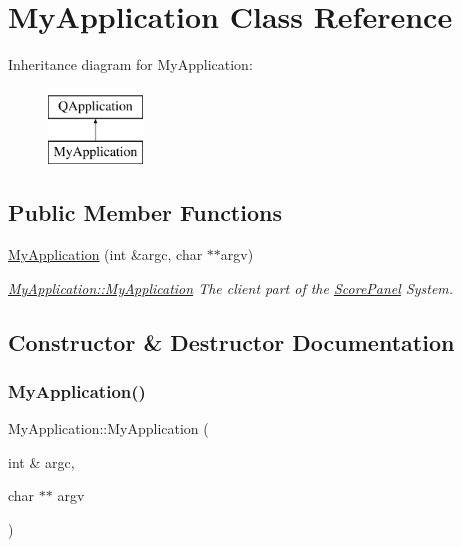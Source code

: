 \hypertarget{classMyApplication}{}\section{My\+Application Class Reference}
\label{classMyApplication}
Inheritance diagram for My\+Application\+:\begin{figure}[H]
\begin{center}
\leavevmode
\includegraphics[height=2.000000cm]{dc/d75/classMyApplication}
\end{center}
\end{figure}
\subsection*{Public Member Functions}
\begin{DoxyCompactItemize}
\item 
\mbox{\hyperlink{classMyApplication_a4b9e70ce40a83d5d4ae99253a6933c02}{My\+Application}} (int \&argc, char $\ast$$\ast$argv)
\begin{DoxyCompactList}\small\item\em \mbox{\hyperlink{classMyApplication_a4b9e70ce40a83d5d4ae99253a6933c02}{My\+Application\+::\+My\+Application}} The client part of the \mbox{\hyperlink{classScorePanel}{Score\+Panel}} System. \end{DoxyCompactList}\end{DoxyCompactItemize}


\subsection{Constructor \& Destructor Documentation}
\mbox{\label{classMyApplication_a4b9e70ce40a83d5d4ae99253a6933c02}} 
\subsubsection{\texorpdfstring{My\+Application()}{MyApplication()}}
{\footnotesize\ttfamily My\+Application\+::\+My\+Application (\begin{DoxyParamCaption}\item[{int \&}]{argc,  }\item[{char $\ast$$\ast$}]{argv }\end{DoxyParamCaption})}



